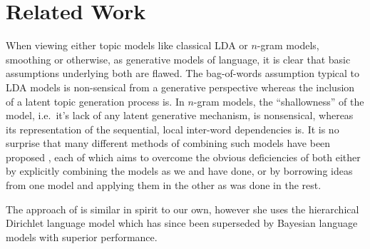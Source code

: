 \section{Related Work}


When viewing either topic models like classical LDA or $n$-gram models, smoothing or otherwise,  as generative models of language, it is clear that basic assumptions underlying both are flawed.  The bag-of-words assumption typical to LDA models is non-sensical from a generative perspective whereas the inclusion of a latent topic generation process is.  In $n$-gram models, the ``shallowness'' of the model, i.e.~it's lack of any latent generative mechanism, is nonsensical, whereas its representation of the sequential, local inter-word dependencies is.  It is no surprise that many different methods of combining such models have been proposed \cite{Griffiths2005,Wang2005,Wallach2006,Gruber2007}, each of which aims to overcome the obvious deficiencies of both either by explicitly combining the models as we and \cite{Wallach2006} have done, or by borrowing ideas from one model and applying them in the other as was done in the rest.

The approach of \cite{Wallach2006} is similar in spirit to our own, however she uses the hierarchical Dirichlet language model \cite{MacKay1995} which has since been superseded by Bayesian language models with superior performance. 

